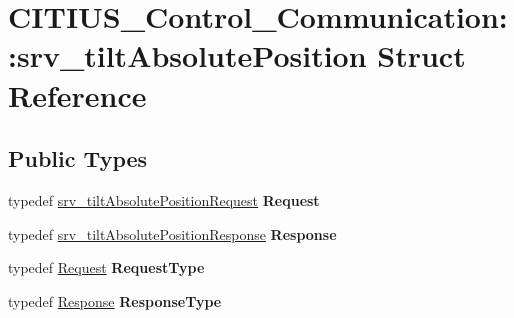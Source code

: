 \hypertarget{struct_c_i_t_i_u_s___control___communication_1_1srv__tilt_absolute_position}{\section{\-C\-I\-T\-I\-U\-S\-\_\-\-Control\-\_\-\-Communication\-:\-:srv\-\_\-tilt\-Absolute\-Position \-Struct \-Reference}
\label{struct_c_i_t_i_u_s___control___communication_1_1srv__tilt_absolute_position}
}
\subsection*{\-Public \-Types}
\begin{DoxyCompactItemize}
\item 
\hypertarget{struct_c_i_t_i_u_s___control___communication_1_1srv__tilt_absolute_position_a4633e25b6806809fb74287985e4c7d9e}{typedef \*
\hyperlink{struct_c_i_t_i_u_s___control___communication_1_1srv__tilt_absolute_position_request__}{srv\-\_\-tilt\-Absolute\-Position\-Request} {\bfseries \-Request}}\label{struct_c_i_t_i_u_s___control___communication_1_1srv__tilt_absolute_position_a4633e25b6806809fb74287985e4c7d9e}

\item 
\hypertarget{struct_c_i_t_i_u_s___control___communication_1_1srv__tilt_absolute_position_a496e9cf03d634d759336f67100475dab}{typedef \*
\hyperlink{struct_c_i_t_i_u_s___control___communication_1_1srv__tilt_absolute_position_response__}{srv\-\_\-tilt\-Absolute\-Position\-Response} {\bfseries \-Response}}\label{struct_c_i_t_i_u_s___control___communication_1_1srv__tilt_absolute_position_a496e9cf03d634d759336f67100475dab}

\item 
\hypertarget{struct_c_i_t_i_u_s___control___communication_1_1srv__tilt_absolute_position_aef2c3210bd617fc3cee3af8e31d9b7af}{typedef \hyperlink{struct_c_i_t_i_u_s___control___communication_1_1srv__tilt_absolute_position_request__}{\-Request} {\bfseries \-Request\-Type}}\label{struct_c_i_t_i_u_s___control___communication_1_1srv__tilt_absolute_position_aef2c3210bd617fc3cee3af8e31d9b7af}

\item 
\hypertarget{struct_c_i_t_i_u_s___control___communication_1_1srv__tilt_absolute_position_a280642d0868227809ecad255486d5360}{typedef \hyperlink{struct_c_i_t_i_u_s___control___communication_1_1srv__tilt_absolute_position_response__}{\-Response} {\bfseries \-Response\-Type}}\label{struct_c_i_t_i_u_s___control___communication_1_1srv__tilt_absolute_position_a280642d0868227809ecad255486d5360}

\end{DoxyCompactItemize}
